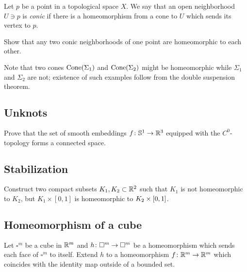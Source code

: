 Let $p$ be a point in a topological space $X$.
We say that an open neighborhood $U\ni p$ is \emph{conic}
if there is a homeomorphism from a cone
to $U$ which sends its vertex to $p$.

\begin{pr}  
Show that any two conic neighborhoods of one point are homeomorphic to each other.
\end{pr}

Note that two cones $\mathop{\rm Cone}(\Sigma_1)$ and $\mathop{\rm Cone}(\Sigma_2)$ might be homeomorphic while $\Sigma_1$ and $\Sigma_2$ are not;
existence of such examples follow from the double suspension theorem.

\subsection*{Unknots\easy}\label{No knots}

\begin{pr}
Prove that the set of smooth embeddings $f\:\mathbb{S}^1\z\to\RR^3$ equipped with the $C^0$-topology 
forms a connected space.
\end{pr}

\subsection*{Stabilization}\label{Simple stabilization}

\begin{pr}
Construct two compact subsets $K_1, K_2\subset\mathbb{R}^2$ such that
$K_1$ is not homeomorphic to $K_2$, but $K_1\times[0,1]$ is homeomorphic to $K_2\z\times[0,1]$.
\end{pr}

\subsection*{Homeomorphism of a cube}\label{Homeomorphism of cube}

\begin{pr}
Let $\square^m$ be a cube in $\mathbb{R}^m$
and $h\:\square^m\z\to\square^m$ be
a homeomorphism which sends each face of $\square^m$ to itself.
Extend $h$ to a homeomorphism $f\colon\mathbb{R}^m\to\mathbb{R}^m$ which coincides with the identity map outside of a bounded set.    
\end{pr}

